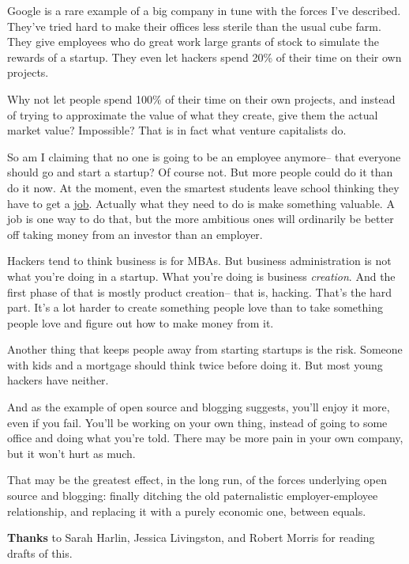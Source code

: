 Google is a rare example of a big company in tune with the forces I've
described. They've tried hard to make their offices less sterile than
the usual cube farm. They give employees who do great work large grants
of stock to simulate the rewards of a startup. They even let hackers
spend 20\% of their time on their own projects.

Why not let people spend 100\% of their time on their own projects, and
instead of trying to approximate the value of what they create, give
them the actual market value? Impossible? That is in fact what venture
capitalists do.

So am I claiming that no one is going to be an employee anymore-- that
everyone should go and start a startup? Of course not. But more people
could do it than do it now. At the moment, even the smartest students
leave school thinking they have to get a \href{hiring.html}{job}.
Actually what they need to do is make something valuable. A job is one
way to do that, but the more ambitious ones will ordinarily be better
off taking money from an investor than an employer.

Hackers tend to think business is for MBAs. But business administration
is not what you're doing in a startup. What you're doing is business
\emph{creation}. And the first phase of that is mostly product
creation-- that is, hacking. That's the hard part. It's a lot harder to
create something people love than to take something people love and
figure out how to make money from it.

Another thing that keeps people away from starting startups is the risk.
Someone with kids and a mortgage should think twice before doing it. But
most young hackers have neither.

And as the example of open source and blogging suggests, you'll enjoy it
more, even if you fail. You'll be working on your own thing, instead of
going to some office and doing what you're told. There may be more pain
in your own company, but it won't hurt as much.

That may be the greatest effect, in the long run, of the forces
underlying open source and blogging: finally ditching the old
paternalistic employer-employee relationship, and replacing it with a
purely economic one, between equals.


\textbf{Thanks} to Sarah Harlin, Jessica Livingston, and Robert Morris
for reading drafts of this.